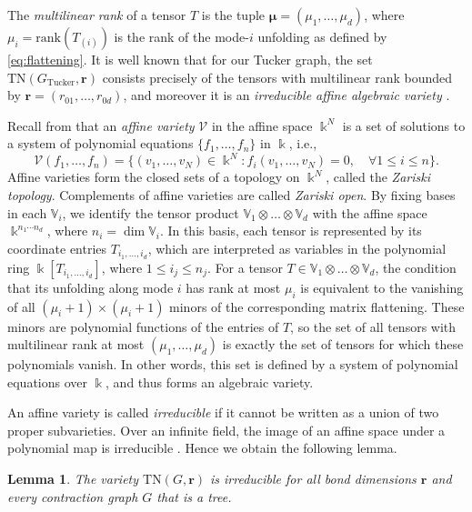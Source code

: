 \documentclass{amsart}
\theoremstyle{plain}
\newtheorem{lemma}[theorem]{Lemma}
\theoremstyle{definition}
\theoremstyle{remark}
\begin{document}
The \textit{multilinear rank} of a tensor $T$ is the tuple $\boldsymbol{\mu}=(\mu_1,\dots, \mu_d)$, where $\mu_i = \mathrm{rank}(T_{(i)})$ is the rank of the mode-$i$ unfolding as defined by \eqref{eq:flattening}. It is well known that for our Tucker graph, the set $\mathrm{TN}(G_\text{Tucker}, \boldsymbol{r})$ consists precisely of the tensors with multilinear rank bounded by $\boldsymbol{r} = (r_{01},\ldots,r_{0d})$, and moreover it is an \emph{irreducible affine algebraic variety} \cite{carlinikleppe, Landsberg2012}. 

Recall from \cite{idealsvarieties} that an \textit{affine variety} $\mathcal V$ in the affine space $\Bbbk ^N$ is a set of solutions to a system of polynomial equations $\{f_1,\dots, f_n\}$ in $\Bbbk$, i.e.,
\[
\mathcal V(f_1,\dots,f_n)=\{(v_1,\dots,v_N)\in \Bbbk^N: f_i(v_1,\dots, v_N)=0,\quad \forall 1\le i\le n\}.
\]
Affine varieties form the closed sets of a topology on $\Bbbk ^N$, called the \emph{Zariski topology}. Complements of affine varieties are called \emph{Zariski open}.
By fixing bases in each $\mathbb V_i$, we identify the tensor product $\mathbb V_1 \otimes \dots \otimes \mathbb V_d$ with the affine space $\Bbbk^{n_1 \cdots n_d}$, where $n_i = \dim \mathbb V_i$. In this basis, each tensor is represented by its coordinate entries $T_{i_1,\dots,i _d}$, which are interpreted as variables in the polynomial ring $\Bbbk[T_{i_1,\dots, i_d}]$, where $1\le i_j\le n_j$. For a tensor $T\in\mathbb V_1\otimes\dots\otimes\mathbb V_d$, the condition that its unfolding along mode $i$ has rank at most $\mu_i$ is equivalent to the vanishing of all $(\mu_i+1)\times(\mu_i+1)$ minors of the corresponding matrix flattening. These minors are polynomial functions of the entries of $T$, so the set of all tensors with multilinear rank at most $(\mu_1,\dots,\mu_d)$ is exactly the set of tensors for which these polynomials vanish. In other words, this set is defined by a system of polynomial equations over $\Bbbk$, and thus forms an algebraic variety. 

An affine variety is called \emph{irreducible} if it cannot be written as a union of two proper subvarieties. Over an infinite field, the image of an affine space under a polynomial map is irreducible \cite[Proposition 4.5.5]{idealsvarieties}. Hence we obtain the following lemma.  

\begin{lemma}\label{lem:irreducibility}
    The variety $\mathrm{TN}(G, \boldsymbol{r})$ is irreducible for all bond dimensions $\mathbf{r}$ and every contraction graph $G$ that is a tree.
\end{lemma}
\end{document}
